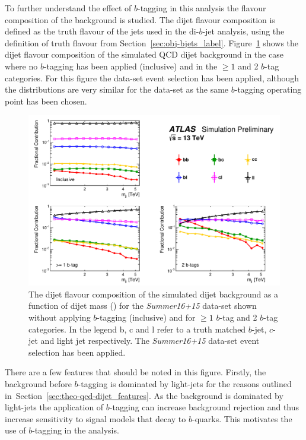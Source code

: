 To further understand the effect of $b$-tagging in this analysis the flavour composition of the background is studied.
The dijet flavour composition is defined as the truth flavour of the jets used in the di-$b$-jet analysis,
using the definition of truth flavour from Section~\ref{sec:obj-bjets_label}.
Figure~\ref{fig:evt-summer_flavcomp} shows the dijet flavour composition of the simulated QCD dijet background in
the case where no $b$-tagging has been applied (inclusive) and in the $\geq1$ and 2 $b$-tag categories.
For this figure the \summer{} data-set event selection has been applied,
although the distributions are very similar for the \hm{} data-set
as the same $b$-tagging operating point has been chosen.

\begin{figure}[!ht]
  \begin{center}
    \includegraphics[width=0.99\linewidth, angle=0]{figs/Dibjet/ICHEP/evt-summer_flavcomp.pdf}
  \end{center}
  \caption{The dijet flavour composition of the simulated dijet background as a function of dijet mass (\mjj{}) for the \textit{Summer16+15} data-set
    shown without applying $b$-tagging (inclusive) and for $\geq1$ $b$-tag and 2 $b$-tag categories.
    In the legend b, c and l refer to a truth matched $b$-jet, $c$-jet and light jet respectively.
    The \textit{Summer16+15} data-set event selection has been applied.}
  \label{fig:evt-summer_flavcomp}
\end{figure}

There are a few features that should be noted in this figure.
Firstly, the background before $b$-tagging is dominated by light-jets
for the reasons outlined in~Section~\ref{sec:theo-qcd-dijet_features}.
As the background is dominated by light-jets the application
of $b$-tagging can increase background rejection
and thus increase sensitivity to signal models that decay to $b$-quarks.
This motivates the use of $b$-tagging in the analysis.

